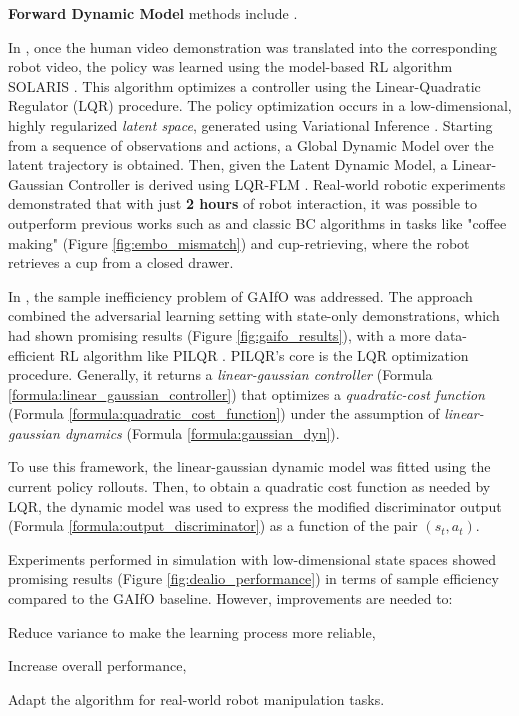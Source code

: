 

\textbf{Forward Dynamic Model} methods include \cite{smith2019avid,torabi2021dealio}.

In \cite{smith2019avid}, once the human video demonstration was translated into the corresponding robot video, the policy was learned using the model-based RL algorithm SOLARIS \cite{zhang2019solar}. This algorithm optimizes a controller using the Linear-Quadratic Regulator (LQR) procedure. The policy optimization occurs in a low-dimensional, highly regularized \textit{latent space}, generated using Variational Inference \cite{Kingma2014_vae}. Starting from a sequence of observations and actions, a Global Dynamic Model over the latent trajectory is obtained. Then, given the Latent Dynamic Model, a Linear-Gaussian Controller is derived using LQR-FLM \cite{levine2014lqr_flm}. Real-world robotic experiments demonstrated that with just \textbf{2 hours} of robot interaction, it was possible to outperform previous works such as \cite{sermanet2018time_contrastive,torabi2018bco} and classic BC algorithms in tasks like "coffee making" (Figure \ref{fig:embo_mismatch}) and cup-retrieving, where the robot retrieves a cup from a closed drawer.

In \cite{torabi2021dealio}, the sample inefficiency problem of GAIfO \cite{torabi2018gaifo} was addressed. The approach combined the adversarial learning setting with state-only demonstrations, which had shown promising results (Figure \ref{fig:gaifo_results}), with a more data-efficient RL algorithm like PILQR \cite{chebotar2017pilqr}. PILQR's core is the LQR optimization procedure. Generally, it returns a \textit{linear-gaussian controller} (Formula \ref{formula:linear_gaussian_controller}) that optimizes a \textit{quadratic-cost function} (Formula \ref{formula:quadratic_cost_function}) under the assumption of \textit{linear-gaussian dynamics} (Formula \ref{formula:gaussian_dyn}).



To use this framework, the linear-gaussian dynamic model was fitted using the current policy rollouts. Then, to obtain a quadratic cost function as needed by LQR, the dynamic model was used to express the modified discriminator output (Formula \ref{formula:output_discriminator}) as a function of the pair $(s_{t}, a_{t})$.



Experiments performed in simulation with low-dimensional state spaces showed promising results (Figure \ref{fig:dealio_performance}) in terms of sample efficiency compared to the GAIfO baseline. However, improvements are needed to:
\begin{enumerate*}[label=\textbf{(\arabic*)}]
    \item Reduce variance to make the learning process more reliable,
    \item Increase overall performance,
    \item Adapt the algorithm for real-world robot manipulation tasks.
\end{enumerate*}



